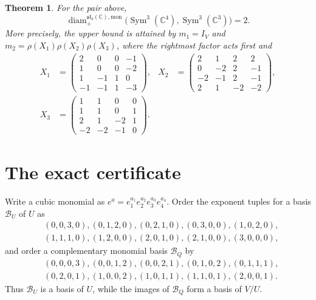 \documentclass[11pt]{article}
\newtheorem{theorem}{Theorem}
\newcommand{\C}{\mathbb{C}}
\newcommand{\Sym}{\operatorname{Sym}}
\newcommand{\diam}{\operatorname{diam}_{+}}
\newcommand{\slie}{\mathfrak{sl}}
\begin{document}
\begin{theorem}\label{thm:main}
For the pair above,
\[
 \diam^{\slie_4(\C),\mathrm{mon}}
 \bigl(\Sym^3(\C^4),\Sym^3(\C^3)\bigr)=2.
\]
More precisely, the upper bound is attained by $m_1=I_V$ and
$m_2=\rho(X_1)\rho(X_2)\rho(X_3)$, where the rightmost factor acts first and
\[
\begin{aligned}
X_1&=\begin{pmatrix}
 2& 0& 0&-1\\ 1& 0& 0&-2\\ 1&-1& 1& 0\\-1&-1& 1&-3
\end{pmatrix},&
X_2&=\begin{pmatrix}
 2& 1& 2& 2\\ 0&-2& 2&-1\\-2&-1& 2&-1\\ 2& 1&-2&-2
\end{pmatrix},\\[4pt]
X_3&=\begin{pmatrix}
 1& 1& 0& 0\\ 1& 1& 0& 1\\ 2& 1&-2& 1\\-2&-2&-1& 0
\end{pmatrix}.
\end{aligned}
\]
\end{theorem}

\section{The exact certificate}

Write a cubic monomial as $e^a=e_1^{a_1}e_2^{a_2}e_3^{a_3}e_4^{a_4}$.
Order the exponent tuples for a basis $\mathcal B_U$ of $U$ as
\begin{align*}
 &(0,0,3,0),(0,1,2,0),(0,2,1,0),(0,3,0,0),(1,0,2,0),\\
 &(1,1,1,0),(1,2,0,0),(2,0,1,0),(2,1,0,0),(3,0,0,0),
\end{align*}
and order a complementary monomial basis $\mathcal B_Q$ by
\begin{align*}
 &(0,0,0,3),(0,0,1,2),(0,0,2,1),(0,1,0,2),(0,1,1,1),\\
 &(0,2,0,1),(1,0,0,2),(1,0,1,1),(1,1,0,1),(2,0,0,1).
\end{align*}
Thus $\mathcal B_U$ is a basis of $U$, while the images of
$\mathcal B_Q$ form a basis of $V/U$.
\end{document}
